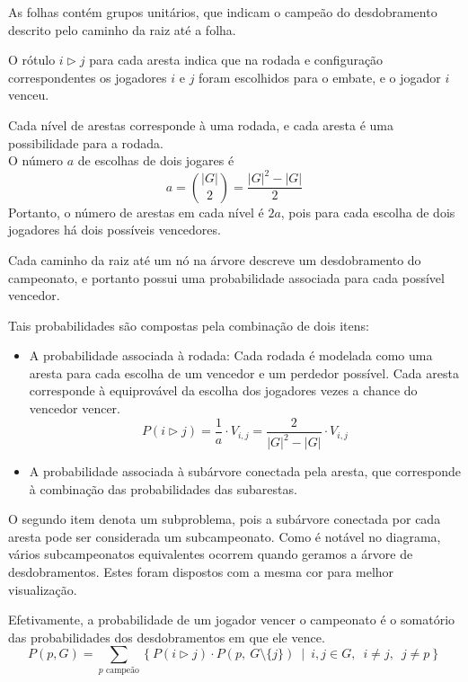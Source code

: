 \documentclass{article}
\begin{document}
\noindent As folhas contém grupos unitários, que indicam o campeão do desdobramento descrito pelo caminho da raiz até a folha.

\noindent O rótulo $i \triangleright j$ para cada aresta indica que na rodada e configuração correspondentes os jogadores $i$ e $j$ foram escolhidos para o embate, e o jogador $i$ venceu.

\noindent Cada nível de arestas corresponde à uma rodada, e cada aresta é uma possibilidade para a rodada. \\
O número $a$ de escolhas de dois jogares é
\begin{equation} \label{eq:combinations}
  a = \binom{|G|}{2} = \frac{{|G|}^2 - |G|}{2}
\end{equation}
Portanto, o número de arestas em cada nível é $2a$, pois para cada escolha de dois jogadores há dois possíveis vencedores.

\noindent Cada caminho da raiz até um nó na árvore descreve um desdobramento do campeonato, e portanto possui uma probabilidade associada para cada possível vencedor.

\pagebreak

\noindent Tais probabilidades são compostas pela combinação de dois itens:
\begin{itemize}
  \item A probabilidade associada à rodada: Cada rodada é modelada como uma aresta para cada escolha de um vencedor e um perdedor possível. Cada aresta corresponde à equiprovável da escolha dos jogadores vezes a chance do vencedor vencer.
    \[ P(i \triangleright j) = \frac{1}{a} \cdot V_{i,j} = \frac{2}{{|G|}^2 - |G|} \cdot V_{i,j} \]
  \item A probabilidade associada à subárvore conectada pela aresta, que corresponde à combinação das probabilidades das subarestas.
\end{itemize}

\noindent O segundo item denota um subproblema, pois a subárvore conectada por cada aresta pode ser considerada um subcampeonato. Como é notável no diagrama, vários subcampeonatos equivalentes ocorrem quando geramos a árvore de desdobramentos. Estes foram dispostos com a mesma cor para melhor visualização.

\noindent Efetivamente, a probabilidade de um jogador vencer o campeonato é o somatório das probabilidades dos desdobramentos em que ele vence.
\[ P(p, G) = \sum_{p \text{ campeão}}\left\{ P(i \triangleright j) \cdot P\left(p, \> G \setminus \{j\} \right) \enspace\Big|\enspace i,j \in G, \enspace i \neq j, \enspace j \neq p \right\} \]
\end{document}
